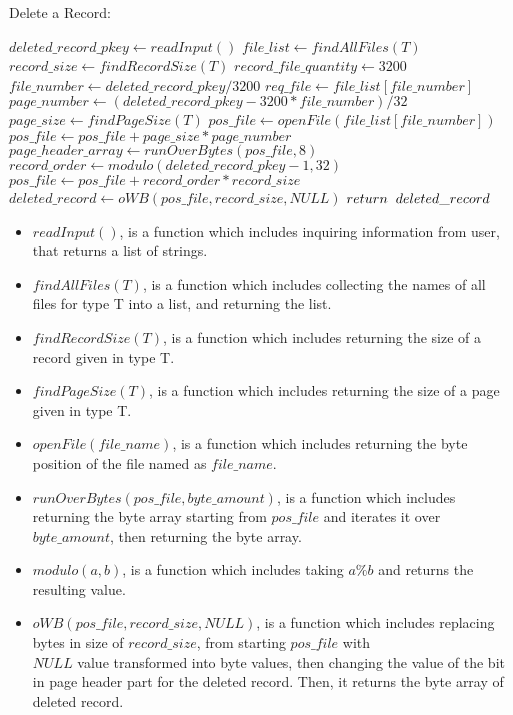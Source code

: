 \documentclass[12pt]{report}
\begin{document}
\begin{algorithm}
\caption{Delete a Record:}
\begin{algorithmic}[1]
	\STATE $deleted\_record\_pkey \leftarrow readInput()$
	\STATE $file\_list \leftarrow findAllFiles(T)$
	\STATE $record\_size \leftarrow findRecordSize(T)$
	\STATE $record\_file\_quantity \leftarrow 3200$
	\STATE $file\_number \leftarrow deleted\_record\_pkey / 3200$
	\STATE $req\_file \leftarrow file\_list[file\_number]$
	\STATE $page\_number \leftarrow (deleted\_record\_pkey - 3200 * file\_number) / 32$
	\STATE $page\_size \leftarrow findPageSize(T)$
	\STATE $pos\_file \leftarrow openFile(file\_list[file\_number])$
	\STATE $pos\_file \leftarrow pos\_file + page\_size * page\_number$
	\STATE $page\_header\_array \leftarrow runOverBytes(pos\_file, 8)$
	\STATE $record\_order \leftarrow modulo(deleted\_record\_pkey - 1, 32)$
	\STATE $pos\_file \leftarrow pos\_file + record\_order * record\_size$
	\STATE $deleted\_record \leftarrow oWB(pos\_file, record\_size, NULL)$
	\STATE $return\hspace{0.2cm}deleted\_record$
\end{algorithmic}
\end{algorithm}

\begin{itemize}
\item $readInput()$, is a function which includes inquiring information from user, that returns a list of strings.
\item $findAllFiles(T)$, is a function which includes collecting the names of all files for type T into a list, and returning the list.
\item $findRecordSize(T)$, is a function which includes returning the size of a record given in type T.
\item $findPageSize(T)$, is a function which includes returning the size of a page given in type T.
\item $openFile(file\_name)$, is a function which includes returning the byte position of the file named as $file\_name$.
\item $runOverBytes(pos\_file, byte\_amount)$, is a function which includes returning the byte array starting from $pos\_file$ and iterates it over $byte\_amount$, then returning the byte array.
\item $modulo(a,b)$, is a function which includes taking $a\%b$ and returns the resulting value.
\item $oWB(pos\_file, record\_size, NULL)$, is a function which includes replacing bytes in size of $record\_size$, from starting $pos\_file$ with \\ 
$NULL$ value transformed into byte values, then changing the value of the bit in page header part for the deleted record. Then, it returns the byte array of deleted record.
\end{itemize}
\end{document}
